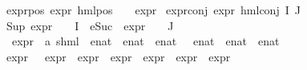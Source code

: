 \begin{isabellebody}
expr{\isacharunderscore}{\kern0pt}{}{\isacharunderscore}{\kern0pt}pos{\isacharcolon}{\kern0pt}\ {\isacartoucheopen}expr{\isacharunderscore}{\kern0pt}{}\ {\isacharparenleft}{\kern0pt}hml{\isacharunderscore}{\kern0pt}pos\ {\isasymalpha}\ {\isasymphi}{\isacharparenright}{\kern0pt}\ {\isacharequal}{\kern0pt}\ expr{\isacharunderscore}{\kern0pt}{}\ {\isasymphi}{\isacartoucheclose}{\isacharbar}{\kern0pt}\isanewline
expr{\isacharunderscore}{\kern0pt}{}{\isacharunderscore}{\kern0pt}conj{\isacharcolon}{\kern0pt}\ {\isacartoucheopen}expr{\isacharunderscore}{\kern0pt}{}\ {\isacharparenleft}{\kern0pt}hml{\isacharunderscore}{\kern0pt}conj\ I\ J\ {\isasymPhi}{\isacharparenright}{\kern0pt}\ {\isacharequal}{\kern0pt}\ \isanewline
{\isacharparenleft}{\kern0pt}Sup\ {\isacharparenleft}{\kern0pt}{\isacharparenleft}{\kern0pt}expr{\isacharunderscore}{\kern0pt}{}\ {\isasymcirc}\ {\isasymPhi}{\isacharparenright}{\kern0pt}\ {\isacharbackquote}{\kern0pt}\ I\ {\isasymunion}\ {\isacharparenleft}{\kern0pt}{\isacharparenleft}{\kern0pt}eSuc\ {\isasymcirc}\ expr{\isacharunderscore}{\kern0pt}{}\ {\isasymcirc}\ {\isasymPhi}{\isacharparenright}{\kern0pt}\ {\isacharbackquote}{\kern0pt}\ J{\isacharparenright}{\kern0pt}{\isacharparenright}{\kern0pt}{\isacharparenright}{\kern0pt}{\isacartoucheclose}\isanewline
\isanewline
\isanewline
{}\isamarkupfalse%
\ expr\ {\isacharcolon}{\kern0pt}{\isacharcolon}{\kern0pt}\ {\isachardoublequoteopen}{\isacharparenleft}{\kern0pt}{\isacharprime}{\kern0pt}a{\isacharcomma}{\kern0pt}\ {\isacharprime}{\kern0pt}s{\isacharparenright}{\kern0pt}hml\ {\isasymRightarrow}\ enat\ {\isasymtimes}\ enat\ {\isasymtimes}\ enat\ {\isasymtimes}\ \ enat\ {\isasymtimes}\ enat\ {\isasymtimes}\ enat{\isachardoublequoteclose}\ \isanewline
\ \ \isanewline
{\isacartoucheopen}expr\ {\isasymphi}\ {\isacharequal}{\kern0pt}\ {\isacharparenleft}{\kern0pt}expr{\isacharunderscore}{\kern0pt}{}\ {\isasymphi}{\isacharcomma}{\kern0pt}\ expr{\isacharunderscore}{\kern0pt}{}\ {\isasymphi}{\isacharcomma}{\kern0pt}\ expr{\isacharunderscore}{\kern0pt}{}\ {\isasymphi}{\isacharcomma}{\kern0pt}\ expr{\isacharunderscore}{\kern0pt}{}\ {\isasymphi}{\isacharcomma}{\kern0pt}\ expr{\isacharunderscore}{\kern0pt}{}\ {\isasymphi}{\isacharcomma}{\kern0pt}\ expr{\isacharunderscore}{\kern0pt}{}\ {\isasymphi}{\isacharparenright}{\kern0pt}{\isacartoucheclose}\isanewline
%
\isadelimtheory
\ \ \ \ \ \ \ \ \ \ \ \ \ \ \ \ \ \ \ \ \ \ \ \ \ \ \ \ \ \ \ \ \ \isanewline
%
\endisadelimtheory
%
\isatagtheory
{}\isamarkupfalse%
%
\endisatagtheory
{\isafoldtheory}%
%
\isadelimtheory
%
\endisadelimtheory
%
\end{isabellebody}%
